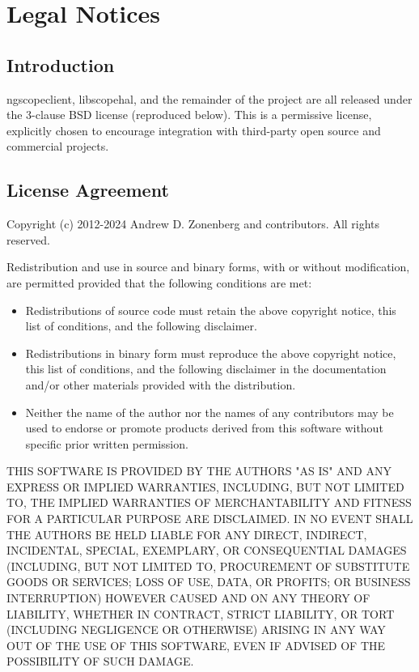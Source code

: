 \chapter{Legal Notices}

\section{Introduction}

ngscopeclient, libscopehal, and the remainder of the project are all released under the 3-clause BSD license
(reproduced below). This is a permissive license, explicitly chosen to encourage integration with third-party open
source and commercial projects.

\section{License Agreement}

Copyright (c) 2012-2024 Andrew D. Zonenberg and contributors.
All rights reserved.

Redistribution and use in source and binary forms, with or without modification, are permitted provided that the
following conditions are met:
\begin{itemize}
\item Redistributions of source code must retain the above copyright notice, this list of conditions, and the
following disclaimer.
\item Redistributions in binary form must reproduce the above copyright notice, this list of conditions, and the
following disclaimer in the documentation and/or other materials provided with the distribution.
\item Neither the name of the author nor the names of any contributors may be used to endorse or promote products
derived from this software without specific prior written permission.
\end{itemize}

THIS SOFTWARE IS PROVIDED BY THE AUTHORS "AS IS" AND ANY EXPRESS OR IMPLIED WARRANTIES, INCLUDING, BUT NOT LIMITED
TO, THE IMPLIED WARRANTIES OF MERCHANTABILITY AND FITNESS FOR A PARTICULAR PURPOSE ARE DISCLAIMED. IN NO EVENT SHALL
THE AUTHORS BE HELD LIABLE FOR ANY DIRECT, INDIRECT, INCIDENTAL, SPECIAL, EXEMPLARY, OR CONSEQUENTIAL DAMAGES
(INCLUDING, BUT NOT LIMITED TO, PROCUREMENT OF SUBSTITUTE GOODS OR SERVICES; LOSS OF USE, DATA, OR PROFITS; OR
BUSINESS INTERRUPTION) HOWEVER CAUSED AND ON ANY THEORY OF LIABILITY, WHETHER IN CONTRACT, STRICT LIABILITY, OR TORT
(INCLUDING NEGLIGENCE OR OTHERWISE) ARISING IN ANY WAY OUT OF THE USE OF THIS SOFTWARE, EVEN IF ADVISED OF THE
POSSIBILITY OF SUCH DAMAGE.

